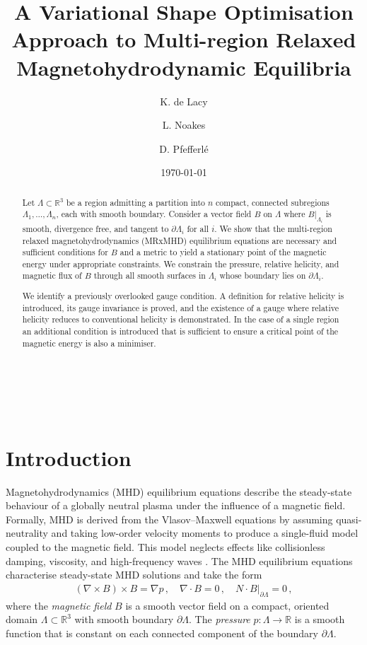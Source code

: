 \documentclass[11pt]{article}
\title{A Variational Shape Optimisation Approach to Multi-region Relaxed Magnetohydrodynamic Equilibria}
\author[1]{K. de Lacy}
\author[1]{L. Noakes}
\author[1]{D. Pfefferl\'e}
\affil[1]{ \small The University of Western Australia, 35 Stirling Highway, Crawley WA 6009, Australia}
\date{\today}
\makeatletter
\theoremstyle{plain}
\theoremstyle{definition}
\theoremstyle{remark}
\newcommand{\R}{\mathbb{R}}
\newcommand{\ST}{\Lambda}
\renewcommand\maketitle{
{\raggedright 
\begin{center}
{\vspace{-5em} \huge \@title }\\[2ex] 
{\Large  \@author}\\[2ex]

\end{center}}}
\makeatother
\begin{document}
\maketitle
\newsavebox\mybox
\savebox{\mybox}{$\stretchrel*{|}{\rule[-.6ex]{0ex}{2.5ex}}$}
\def\myabs#1{\usebox\mybox#1\usebox\mybox}
\vspace{2em}


\begin{abstract}
\noindent
Let \(\ST\subset\mathbb{R}^3\) be a region admitting a partition into \(n\) compact, connected subregions \(\ST_1,\dots,\ST_n\), each with smooth boundary. Consider a vector field \(B\) on \(\ST\) where \(B|_{\ST_i}\) is smooth, divergence free, and tangent to \(\partial \ST_i\) for all \(i\). We show that the multi-region relaxed magnetohydrodynamics (MRxMHD) equilibrium equations are necessary and sufficient conditions for \( B \) and a metric to yield a stationary point of the magnetic energy under appropriate constraints. We constrain the pressure, relative helicity, and magnetic flux of \(B\) through all smooth surfaces in \(\ST_i\) whose boundary lies on \(\partial \ST_i\).

\noindent
We identify a previously overlooked gauge condition. A definition for relative helicity is introduced, its gauge invariance is proved, and the existence of a gauge where relative helicity reduces to conventional helicity is demonstrated. In the case of a single region an additional condition is introduced that is sufficient to ensure a critical point of the magnetic energy is also a minimiser.
\end{abstract}

\section{Introduction}\label{section:Introduction}




Magnetohydrodynamics (MHD) equilibrium equations describe the steady-state behaviour of a globally neutral plasma under the influence of a magnetic field. Formally, MHD is derived from the Vlasov–Maxwell equations by assuming quasi-neutrality and taking low-order velocity moments to produce a single-fluid model coupled to the magnetic field. This model neglects effects like collisionless damping, viscosity, and high-frequency waves \cite{Freidberg_2014}. The MHD equilibrium equations characterise steady-state MHD solutions and take the form
\begin{align*}
  (\nabla \times B) \times B = \nabla p \, , \quad \nabla \cdot B = 0 \, , \quad N \cdot B \big|_{\partial \ST} = 0 \, ,
\end{align*}
where the \emph{magnetic field} \(B\) is a smooth vector field on a compact, oriented domain \(\ST\subset\mathbb{R}^3\) with smooth boundary \(\partial \ST\). The \emph{pressure} \(p : \ST \to \R\) is a smooth function that is constant on each connected component of the boundary \(\partial \ST\). 
\end{document}

